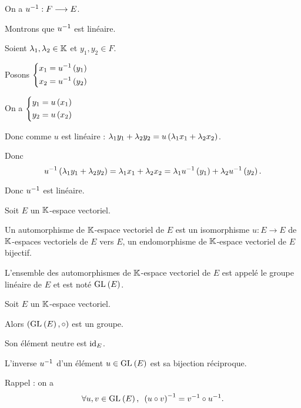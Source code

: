 \begin{dem}
On a \(u^{-1}:F\longrightarrow E\).

Montrons que \(u^{-1}\) est linéaire.

Soient \(\lambda_1,\lambda_2\in\mathbb{K}\) et \(y_1,y_2\in F\).

Posons \(\begin{dcases}
x_1=u^{-1}\left(y_1\right) \\
x_2=u^{-1}\left(y_2\right)
\end{dcases}\)

On a \(\begin{dcases}
y_1=u\left(x_1\right) \\
y_2=u\left(x_2\right)
\end{dcases}\)

Donc comme \(u\) est linéaire : \(\lambda_1y_1+\lambda_2y_2=u\left(\lambda_1x_1+\lambda_2x_2\right)\).

Donc \[u^{-1}\left(\lambda_1y_1+\lambda_2y_2\right)=\lambda_1x_1+\lambda_2x_2=\lambda_1u^{-1}\left(y_1\right)+\lambda_2u^{-1}\left(y_2\right).\]

Donc \(u^{-1}\) est linéaire.
\end{dem}

\begin{defi}[Automorphisme]
Soit \(E\) un \(\mathbb{K}\)-espace vectoriel.

Un automorphisme de \(\mathbb{K}\)-espace vectoriel de \(E\) est un isomorphisme \(u:E\to E\) de \(\mathbb{K}\)-espaces vectoriels de \(E\) vers \(E\), \cad un endomorphisme de \(\mathbb{K}\)-espace vectoriel de \(E\) bijectif.

L'ensemble des automorphismes de \(\mathbb{K}\)-espace vectoriel de \(E\) est appelé le groupe linéaire de \(E\) et est noté \(\GL{}[E]\).
\end{defi}

\begin{prop}
Soit \(E\) un \(\mathbb{K}\)-espace vectoriel.

Alors \(\groupe{\GL{}[E]}[\rond]\) est un groupe.

Son élément neutre est \(\mathrm{id}_{E}\).

L'inverse \(u^{-1}\) d'un élément \(u\in\GL{}[E]\) est sa bijection réciproque.

Rappel : on a \[\quantifs{\forall u,v\in\GL{}[E]}\paren{u\rond v}\inv=v\inv\rond u\inv.\]
\end{prop}

